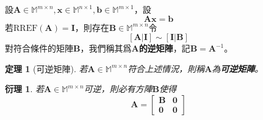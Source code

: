 \documentclass[12pt]{article}
\newcommand{\rref}{\mathrm{RREF}}
\newtheorem*{theorem}{定理}
\newtheorem*{corollary}{衍理}
\begin{document}
    設$\mathbf{A}\in\mathbb{M}^{m\times n}, \mathbf{x}\in\mathbb{M}^{n\times 1},\mathbf{b}\in\mathbb{M}^{m\times 1}$，設$$\mathbf{A}\mathbf{x}=\mathbf{b}$$若$\rref(\mathbf{A})=\mathbf{I}$，則存在$\mathbf{B}\in\mathbb{M}^{m\times n}$令$$[\mathbf{A}|\mathbf{I}]\sim[\mathbf{I}|\mathbf{B}]$$對符合條件的矩陣$\mathbf{B}$，我們稱其爲\textbf{$\mathbf{A}$的逆矩陣}，記$\mathbf{B}=\mathbf{A}^{-1}$。

    \begin{theorem}[可逆矩陣]
        若$\mathbf{A}\in\mathbb{M}^{m\times n}$符合上述情況，則稱$\mathbf{A}$為\textbf{可逆矩陣}。
    \end{theorem}
    \begin{corollary}
        若$\mathbf{A}\in\mathbb{M}^{m\times n}$可逆，則必有方陣$\mathbf{B}$使得$$\mathbf{A}=\begin{bmatrix}
            \mathbf{B}&\mathbf{0}\\
            \mathbf{0}&\mathbf{0}
        \end{bmatrix}$$
    \end{corollary}
\end{document}
